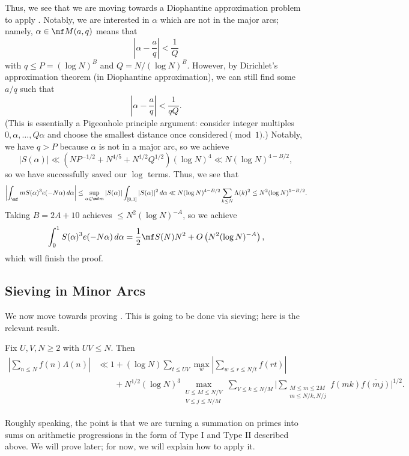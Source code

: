 \documentclass[../notes.tex]{subfiles}
\begin{document}
Thus, we see that we are moving towards a Diophantine approximation problem to apply . Notably, we are interested in $\alpha$ which are not in the major arcs; namely, $\alpha\in\mf M(a,q)$ means that
\[\left|\alpha-\frac aq\right|<\frac1Q\]
with $q\le P=(\log N)^B$ and $Q=N/(\log N)^B$. However, by Dirichlet's approximation theorem (in Diophantine approximation), we can still find some $a/q$ such that
\[\left|\alpha-\frac aq\right|<\frac1{qQ}.\]
(This is essentially a Pigeonhole principle argument: consider integer multiples $0,\alpha,\ldots,Q\alpha$ and choose the smallest distance once considered$\pmod1$.) Notably, we have $q>P$ because $\alpha$ is not in a major arc, so we achieve
\[|S(\alpha)|\ll\left(NP^{-1/2}+N^{4/5}+N^{1/2}Q^{1/2}\right)(\log N)^4\ll N(\log N)^{4-B/2},\]
so we have successfully saved our $\log$ terms. Thus, we see that
\[\left|\int_\mf mS(\alpha)^3e(-N\alpha)\,d\alpha\right|\le\sup_{\alpha\in\mf m}|S(\alpha)|\int_{[0,1]}|S(\alpha)|^2\,d\alpha\ll N(\log N)^{4-B/2}\sum_{k\le N}\Lambda(k)^2\le N^2(\log N)^{5-B/2}.\]
Taking $B=2A+10$ achieves $\le N^2(\log N)^{-A}$, so we achieve
\[\int_0^1S(\alpha)^3e(-N\alpha)\,d\alpha=\frac12\mf S(N)N^2+O\left(N^2(\log N)^{-A}\right),\]
which will finish the proof.

\subsection{Sieving in Minor Arcs}
We now move towards proving . This is going to be done via sieving; here is the relevant result.
\begin{theorem} \label{thm:vinogradov-sieve}
	Fix $U,V,N\ge2$ with $UV\le N$. Then
	\begin{align*}
		\left|\sum_{n\le N}f(n)\Lambda(n)\right| &\ll 1+(\log N)\sum_{t\le UV}\max_w\left|\sum_{w\le r\le N/t}f(rt)\right| \\
		&\qquad+N^{1/2}(\log N)^3\max_{\substack{U\le M\le N/V\\V\le j\le N/M}}\sum_{V\le k\le N/M}\Bigg|\sum_{\substack{M\le m\le2M\\m\le N/k,N/j}}f(mk)\overline{f(mj)}\Bigg|^{1/2}.
	\end{align*}
\end{theorem}
Roughly speaking, the point is that we are turning a summation on primes into sums on arithmetic progressions in the form of Type I and Type II described above. We will prove  later; for now, we will explain how to apply it.
\end{document}
